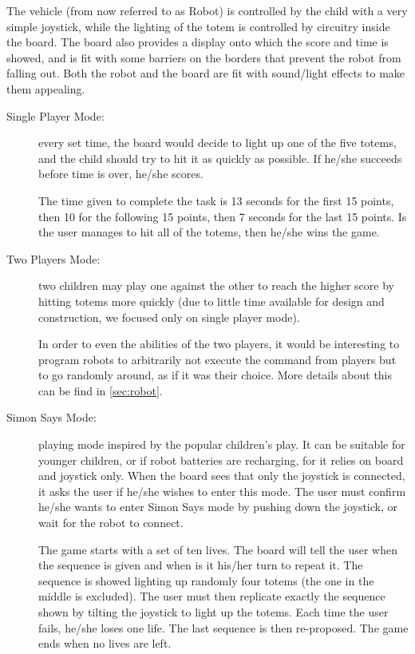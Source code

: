 \documentclass[a4paper,twoside]{book}
\begin{document}
\beforelist* The vehicle (from now referred to as Robot) is controlled by the child with a very simple joystick, while the lighting of the totem is controlled by circuitry inside the board. The board also provides a display onto which the score and time is showed, and is fit with some barriers on the borders that prevent the robot from falling out. Both the robot and the board are fit with sound/light effects to make them appealing.
\begin{description}
\item[Single Player Mode:] every set time, the board would decide to light up one of the five totems, and the child should try to hit it as quickly as possible. If he/she succeeds before time is over, he/she scores.

The time given to complete the task is 13 seconds for the first 15 points, then 10 for the following 15 points, then 7 seconds for the last 15 points. Is the user manages to hit all of the totems, then he/she wins the game.

\item[Two Players Mode:] two children may play one against the other to reach the higher score by hitting totems more quickly
(due to little time available for  design and construction, we focused only on single player mode).

In order to even the abilities of the two players, it would be interesting to program robots to arbitrarily not execute the command from players but to go randomly around, as if it was their choice. More details about this can be find in \autoref{sec:robot}.

\item[Simon Says Mode:] playing mode inspired by the popular children's play. It can be suitable for younger children, or if robot batteries are recharging, for it relies on board and joystick only. When the board sees that only the joystick is connected, it asks the user if he/she wishes to enter this mode. The user must confirm he/she wants to enter Simon Says mode by pushing down the joystick, or wait for the robot to connect. 

The game starts with a set of ten lives. The board will tell the user when the sequence is given and when is it his/her turn to repeat it. The sequence is showed lighting up randomly four totems (the one in the middle is excluded). The user must then replicate exactly the sequence shown by tilting the joystick to light up the totems. Each time the user fails, he/she loses one life. The last sequence is then re-proposed.  The game ends when no lives are left.


\end{description}
\end{document}
